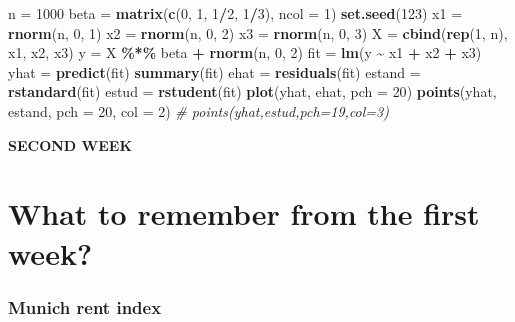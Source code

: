 \documentclass[
]{article}
\newenvironment{Shaded}{\begin{snugshade}}{\end{snugshade}}
\newcommand{\AttributeTok}[1]{\textcolor[rgb]{0.13,0.29,0.53}{#1}}
\newcommand{\CommentTok}[1]{\textcolor[rgb]{0.56,0.35,0.01}{\textit{#1}}}
\newcommand{\DecValTok}[1]{\textcolor[rgb]{0.00,0.00,0.81}{#1}}
\newcommand{\FunctionTok}[1]{\textcolor[rgb]{0.13,0.29,0.53}{\textbf{#1}}}
\newcommand{\NormalTok}[1]{#1}
\newcommand{\OtherTok}[1]{\textcolor[rgb]{0.56,0.35,0.01}{#1}}
\newcommand{\SpecialCharTok}[1]{\textcolor[rgb]{0.81,0.36,0.00}{\textbf{#1}}}
\begin{document}
\begin{Shaded}
\begin{Highlighting}[]
\NormalTok{n }\OtherTok{=} \DecValTok{1000}
\NormalTok{beta }\OtherTok{=} \FunctionTok{matrix}\NormalTok{(}\FunctionTok{c}\NormalTok{(}\DecValTok{0}\NormalTok{, }\DecValTok{1}\NormalTok{, }\DecValTok{1}\SpecialCharTok{/}\DecValTok{2}\NormalTok{, }\DecValTok{1}\SpecialCharTok{/}\DecValTok{3}\NormalTok{), }\AttributeTok{ncol =} \DecValTok{1}\NormalTok{)}
\FunctionTok{set.seed}\NormalTok{(}\DecValTok{123}\NormalTok{)}
\NormalTok{x1 }\OtherTok{=} \FunctionTok{rnorm}\NormalTok{(n, }\DecValTok{0}\NormalTok{, }\DecValTok{1}\NormalTok{)}
\NormalTok{x2 }\OtherTok{=} \FunctionTok{rnorm}\NormalTok{(n, }\DecValTok{0}\NormalTok{, }\DecValTok{2}\NormalTok{)}
\NormalTok{x3 }\OtherTok{=} \FunctionTok{rnorm}\NormalTok{(n, }\DecValTok{0}\NormalTok{, }\DecValTok{3}\NormalTok{)}
\NormalTok{X }\OtherTok{=} \FunctionTok{cbind}\NormalTok{(}\FunctionTok{rep}\NormalTok{(}\DecValTok{1}\NormalTok{, n), x1, x2, x3)}
\NormalTok{y }\OtherTok{=}\NormalTok{ X }\SpecialCharTok{\%*\%}\NormalTok{ beta }\SpecialCharTok{+} \FunctionTok{rnorm}\NormalTok{(n, }\DecValTok{0}\NormalTok{, }\DecValTok{2}\NormalTok{)}
\NormalTok{fit }\OtherTok{=} \FunctionTok{lm}\NormalTok{(y }\SpecialCharTok{\textasciitilde{}}\NormalTok{ x1 }\SpecialCharTok{+}\NormalTok{ x2 }\SpecialCharTok{+}\NormalTok{ x3)}
\NormalTok{yhat }\OtherTok{=} \FunctionTok{predict}\NormalTok{(fit)}
\FunctionTok{summary}\NormalTok{(fit)}
\NormalTok{ehat }\OtherTok{=} \FunctionTok{residuals}\NormalTok{(fit)}
\NormalTok{estand }\OtherTok{=} \FunctionTok{rstandard}\NormalTok{(fit)}
\NormalTok{estud }\OtherTok{=} \FunctionTok{rstudent}\NormalTok{(fit)}
\FunctionTok{plot}\NormalTok{(yhat, ehat, }\AttributeTok{pch =} \DecValTok{20}\NormalTok{)}
\FunctionTok{points}\NormalTok{(yhat, estand, }\AttributeTok{pch =} \DecValTok{20}\NormalTok{, }\AttributeTok{col =} \DecValTok{2}\NormalTok{)}
\CommentTok{\# points(yhat,estud,pch=19,col=3)}
\end{Highlighting}
\end{Shaded}

\textbf{SECOND WEEK}

\hypertarget{what-to-remember-from-the-first-week}{%
\section{What to remember from the first
week?}\label{what-to-remember-from-the-first-week}}

\hypertarget{munich-rent-index-1}{%
\subsubsection{Munich rent index}\label{munich-rent-index-1}}
\end{document}
